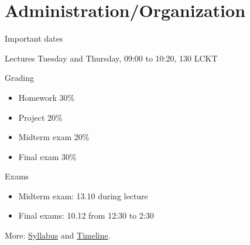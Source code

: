 \documentclass[\classoption]{beamer}
\title{\coursename}
\subtitle{Lecture 1: Introduction and Getting started}
\author{\tiny Patrick Diehl \orcid{}}
\date {
 \tiny \url{\courseurl}
\vspace{2cm}
\doclicenseThis  
  
}
\begin{document}
 {
    \frame {
        \titlepage
    }
}

\frame{

\tableofcontents

}



\section{Administration/Organization}

\begin{frame}{Important dates}
\begin{block}{Lectures}
Tuesday and Thursday, 09:00 to 10:20, 130 LCKT
\end{block}

\begin{block}{Grading}
\begin{itemize}
\item Homework 30\%
\item Project 20\%
\item Midterm exam 20\%
\item  Final exam 30\%
\end{itemize}

\end{block}

\begin{block}{Exams}
\begin{itemize}
\item Midterm exam: 13.10 during lecture
\item Final exams: 10.12 from 12:30 to 2:30
\end{itemize}
\end{block}
\centering
More: \href{\coursesyllabus}{Syllabus} and \href{\coursetimeline}{Timeline}.
\end{frame}
\end{document}
